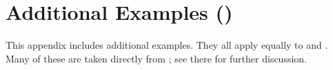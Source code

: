 \section{Additional Examples (\PwTmcaTITLE{})}
\label{sec:extras}

This appendix includes additional examples.  They all apply equally to
 and .  Many of these are taken directly from
\cite{DBLP:journals/pacmpl/JagadeesanJR20}; see there for further discussion.

